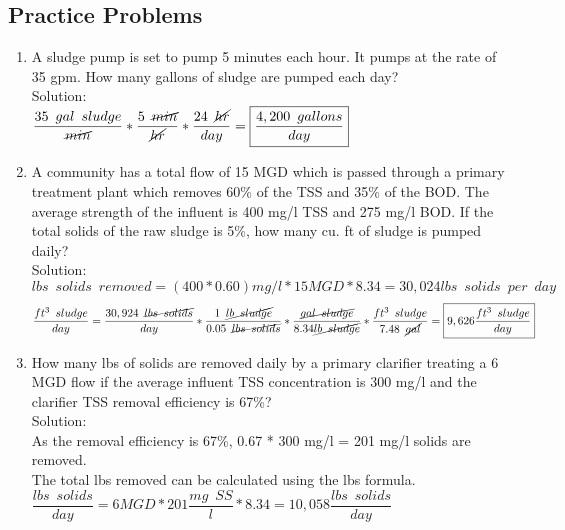 \documentclass{article}
\begin{document}
\begin{enumerate}
\end{enumerate}

\subsection{Practice Problems} 

\begin{enumerate}
\item A sludge pump is set to pump 5 minutes each hour. It pumps at the rate of 35 gpm. How many gallons of sludge are pumped each day?\\
Solution:\\
$\dfrac{35 \enspace gal \enspace sludge}{\cancel{min}}*\dfrac{5 \enspace \cancel{min}}{\cancel{hr}} *\dfrac{24 \enspace \cancel{hr}}{day}=\boxed{\dfrac{4,200 \enspace gallons}{day}}$\\

\item A community has a total flow of 15 MGD which is passed through a primary treatment plant which removes 60\% of the TSS and 35\% of the BOD. The average strength of the influent is 400 mg/l TSS and 275 mg/l BOD. If the total solids of the raw sludge is 5\%, how many cu. ft of sludge is pumped daily?\\
Solution:\\
$lbs \enspace solids \enspace removed=(400*0.60)mg/l*15MGD*8.34=30,024lbs \enspace solids \enspace per \enspace day$
$$\dfrac{ft^3\enspace sludge}{day}= \dfrac{30,924 \enspace \cancel{lbs \enspace solids}}{day} * \dfrac{1 \enspace \cancel{lb \enspace sludge}}{0.05\enspace \cancel{lbs \enspace solids}}*\dfrac{\cancel{gal \enspace sludge}}{8.34\cancel{lb \enspace sludge}}*\dfrac{ft^3 \enspace sludge}{7.48 \enspace \cancel{gal}}=\boxed{9,626\dfrac{ft^3 \enspace sludge}{day}} $$

\item How many lbs of solids are removed daily by a primary clarifier treating a 6 MGD flow if the average influent TSS concentration is 300 mg/l and the clarifier TSS removal efficiency is 67\%?\\
Solution:\\
As the removal efficiency is 67\%, 0.67 * 300 mg/l = 201 mg/l solids are removed.\\
The total lbs removed can be calculated using the lbs formula.\\
$ \dfrac{lbs \enspace solids}{day}= 6 MGD* 201  \dfrac{mg \enspace  SS}{l}*8.34=\boxed{10,058 \dfrac{lbs \enspace solids}{day}}$
\end{enumerate}
\end{document}
